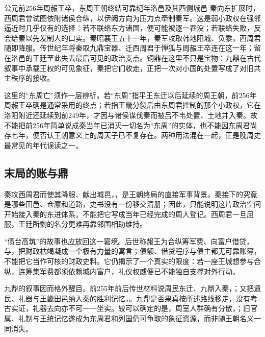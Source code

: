 \begin{event}{公元前256年}{周赧王卒，东周王朝终结}{可靠纪年}{洛邑及其西侧城邑}
秦向东扩展时，西周君曾试图依附诸侯合纵，以伊阙方向为压力点牵制秦军。这是弱小政权在强邻逼近时几乎仅有的选择：若不联络东方诸国，便可能被逐一吞没；若联络失败，反会给秦以先发制人的口实。秦昭襄王五十一年，秦军攻取韩地阳城、负黍，西周君随即降服。传世纪年将秦取九鼎宝器、迁西周君于惮狐与周赧王卒连在这一年；留在洛邑的王廷至此失去最后可见的政治支点。铜鼎在这里不只是宝物：九鼎在古代叙事中承载王权的可见象征，秦把它们收走，正把一次对小国的处置写成了对旧共主秩序的接收。
\end{event}

这里的“东周亡”须作一层辨析。若“东周”指平王东迁以后延续的周王朝，前256年周赧王卒确是通常采用的终点；若指王畿分裂后由东周君控制的那个小政权，它在洛阳附近还延续到前249年，才因与诸侯谋伐秦而被吕不韦处置、土地并入秦。故不能把前256年简单说成秦当年已消灭一切名为“东周”的实体，也不能因东周君尚存七年，便否认王朝意义上的周天子已不复存在。两种用法混在一起，正是晚周史最常见的年代误读之一。

\subsection{末局的账与鼎}

秦攻西周君而使其降服、献出城邑，，是王朝终局的直接军事背景。秦接下的究竟是哪些田邑、仓廪和道路，史书没有一份移交清册；因此，只能说明这片政治空间开始接入秦的东进体系，不能把它写成当年已经完成的周人登记。西周君一旦屈服，王廷所剩的名分更难再靠邻国相助维持。

“债台高筑”的故事也应放回这一窘境。后世称赧王为合纵筹军费、向富户借贷，与，把财政枯竭凝成一个极有力量的寓言；债额、借贷程序与债主都无可靠账簿，不能把它当作可核的财政史料。它仍揭示了一个真实的限度：若一座王城想参与合纵，连筹集军费都须依赖城内富户，礼仪权威便已不能独自支撑对外行动。

九鼎的叙事因而格外醒目。前255年前后传世材料说周民东迁、九鼎入秦，；又把遗民、礼器与王畿田邑纳入秦的胜利记忆，。九鼎是否果真按所述路线移走，没有考古实证，礼器去向亦不可一一坐实。较可以确定的是，周室人群确有分散，；旧官属、礼制与王统记忆遂成为东周君和列国仍可争取的象征资源，而非随王朝名义一同消失。

